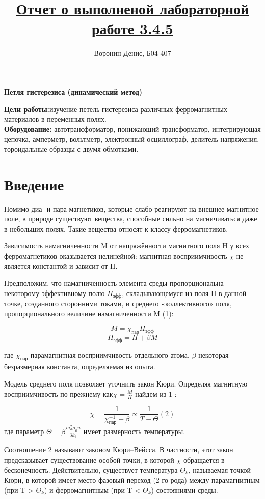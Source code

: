 \documentclass[a4paper]{article}
\title{\underline{Отчет о выполненой лабораторной работе 3.4.5}}
\author{Воронин Денис, Б04-407}
\begin{document}
\maketitle

\begin{center}
\textbf{\Large Петля гистерезиса (динамический метод)}
\end{center}

\textbf{Цели работы:}изучение петель гистерезиса различных ферромагнитных материалов в переменных полях. \\
\textbf{Оборудование:} автотрансформатор, понижающий трансформатор, интегрирующая цепочка, амперметр, вольтметр, электронный
осциллограф, делитель напряжения, тороидальные образцы с двумя обмотками.


\section{Введение}
Помимо диа- и пара магнетиков, которые слабо реагируют на внешнее
магнитное поле, в природе существуют вещества, способные сильно на
магничиваться даже в небольших полях. Такие вещества относят к классу ферромагнетиков. \par
Зависимость намагниченности M от напряжённости магнитного поля H у всех ферромагнетиков оказывается нелинейной: магнитная восприимчивость $\chi $ не является константой и зависит от H.
\par
Предположим, что намагниченность элемента среды пропорциональна некоторому эффективному полю $H_{\text{эфф}}$, складывающемуся из
поля H в данной точке, созданного сторонними токами, и среднего «коллективного» поля, пропорционального величине намагниченности M (1):

\[M=\chi_{\text{пар}}H_{\text{эфф}}\]
\[H_{\text{эфф}}= H + \beta M\] 

где $\chi_{\text{пар}}$  парамагнитная восприимчивость отдельного атома, $\beta $-некоторая безразмерная константа, определяемая из опыта.\par
 Модель среднего поля позволяет уточнить закон Кюри. Определяя
магнитную восприимчивость по-прежнему как$\chi = \frac{M}{H}$ найдем из 1 : 

\[\chi = \frac{1}{\chi_{\text{пар}}^{-1}-\beta} \propto  \frac{1}{T-\Theta  } (2)\]
где параметр $\Theta = \beta \frac{m_{a}^{2}\mu _{0}n}{3k_{\text{б}}} $ имеет размерность температуры.

Соотношение 2 называют законом Кюри–Вейсса. В частности, этот закон предсказывает существование особой точки, в которой
$\chi $ обращается в бесконечность. Действительно, существует температура $\Theta_{k} $, называемая точкой Кюри, в которой имеет место фазовый
переход (2-го рода) между парамагнитным (при T > $\Theta_{k} $) и ферромагнитным (при T < $\Theta_{k} $) состояниями среды.
\end{document}
